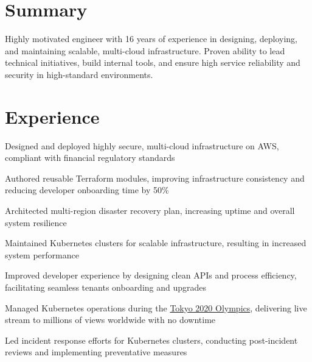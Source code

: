 \documentclass[]{willianpaixao-resume}
\begin{document}
\begin{minipage}[t]{0.64\textwidth}

\section{Summary}
Highly motivated engineer with 16 years of experience in designing, deploying, and maintaining scalable, multi-cloud infrastructure. Proven ability to lead technical initiatives, build internal tools, and ensure high service reliability and security in high-standard environments.
\section{Experience}
\sectionsep
\begin{tightemize}
\item Designed and deployed highly secure, multi-cloud infrastructure on AWS, compliant with financial regulatory standards
\item Authored reusable Terraform modules, improving infrastructure consistency and reducing developer onboarding time by 50\%
\end{tightemize}
\sectionsep
{}
\begin{tightemize}
\item Architected multi-region disaster recovery plan, increasing uptime and overall system resilience
\item Maintained Kubernetes clusters for scalable infrastructure, resulting in increased system performance
\end{tightemize}
\sectionsep

\begin{tightemize}
\item Improved developer experience by designing clean APIs and process efficiency, facilitating seamless tenants onboarding and upgrades
\item Managed Kubernetes operations during the \underline{Tokyo 2020 Olympics}, delivering live stream to millions of views worldwide with no downtime
\item Led incident response efforts for Kubernetes clusters, conducting post-incident reviews and implementing preventative measures
\end{tightemize}
\sectionsep


\end{minipage}
\end{document}
